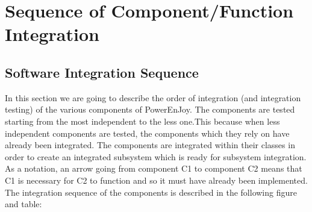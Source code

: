 \section{Sequence of Component/Function Integration}
\subsection{Software Integration Sequence}
In this section we are going to describe the order of integration (and integration
testing) of the various components of PowerEnJoy.
The components are tested starting from the most independent to the less
one.This because when less independent components are tested, the components which
they rely on have already been integrated. The components are integrated
within their classes in order to create an integrated subsystem which is ready
for subsystem integration.
As a notation, an arrow going from component C1 to component C2 means that C1 is necessary for C2 to function and so it must have already been implemented.
The integration sequence of the components is described in the following figure and table:



